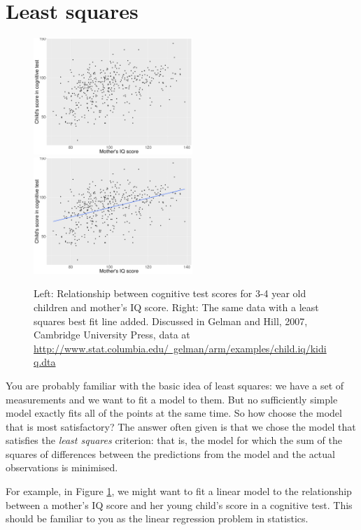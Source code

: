 \section{Least squares} \label{sec:leastsquares}


\begin{figure}[h]
\includegraphics[width=6cm]{figures/kidiq}
\includegraphics[width=6cm]{figures/kidiqlm}
\caption{Left: Relationship between cognitive test scores for 3-4 year old children and mother's IQ score. Right: The same data with a least squares best fit line added. Discussed in Gelman and Hill, 2007, Cambridge University Press, data at \href{http://www.stat.columbia.edu/~gelman/arm/examples/child.iq/kidiq.dta}{http://www.stat.columbia.edu/~gelman/arm/examples/child.iq/kidiq.dta}}
\label{fig:leastsq}
\end{figure}

You are probably familiar with the basic idea of least squares: we have a set of measurements and we want to fit a model to them.  But no sufficiently simple model exactly fits all of the points at the same time. So how choose the model that is most satisfactory?  The answer often given is that we chose the model that satisfies the {\em least squares} criterion:  that is, the model for which the sum of the squares of differences between the predictions from the model and the actual observations is minimised.  

For example, in Figure  \ref{fig:leastsq}, we might want to fit a linear model to the relationship between a mother's IQ score and her young child's score in a cognitive test. This should be familiar to you as the linear regression problem in statistics.

